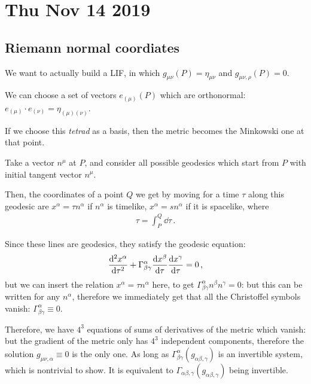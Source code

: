\documentclass[main.tex]{subfiles}
\begin{document}
\section*{Thu Nov 14 2019}

\subsection{Riemann normal coordiates}

We want to actually build a LIF, in which \(g_{\mu \nu } (P ) = \eta_{\mu \nu }\) and \(g_{\mu \nu , \rho } (P)= 0\).

We can choose a set of vectors \(e_{(\mu )} (P)\) which are orthonormal: \(e_{(\mu )} \cdot e_{(\nu )} = \eta_{(\mu )(\nu )}\). 

If we choose this \emph{tetrad} as a basis, then the metric becomes the Minkowski one at that point.

Take a vector \(n^{\mu }\) at \(P\), and consider all possible geodesics which start from \(P\) with initial tangent vector \(n^{\mu }\).

Then, the coordinates of a point \(Q\) we get by moving for a time \(\tau \) along this geodesic are \(x^{\alpha } = \tau n^{\alpha }\) if \(n^{\alpha }\) is timelike, \(x^{\alpha } = s n^{\alpha }\) if it is spacelike, where 
%
\begin{align}
  \tau = \int _{P}^{Q} \dd{\tau } 
\,.
\end{align}

Since these lines are geodesics, they satisfy the geodesic equation: 
%
\begin{align}
  \dv[2]{x^{\alpha }}{\tau } + \Gamma^{\alpha }_{\beta \gamma } \dv{x^{\beta }}{\tau } \dv{x^{\gamma }}{\tau } = 0
\,,
\end{align}
%
but we can insert the relation \(x^{\alpha } = \tau n^{\alpha }\) here, to get \(\Gamma^{\alpha }_{\beta \gamma } n^{\beta } n^{\gamma }=0\): but this can be written for any \(n^{\alpha }\), therefore we immediately get that all the Christoffel symbols vanish: \(\Gamma^{ \alpha }_{\beta \gamma } \equiv 0\). 

Therefore, we have \(4^{3}\) equations of sums of derivatives of the metric which vanish: but the gradient of the metric only has \(4^{3}\) independent components, therefore the solution \(g_{\mu \nu , \alpha } \equiv 0\) is the only one.
As long as \(\Gamma^{\alpha }_{\beta \gamma } (g_{\alpha \beta , \gamma })\) is an invertible system, which is nontrivial to show.
It is equivalent to \(\Gamma_{\alpha \beta , \gamma } (g_{\alpha \beta , \gamma })\) being invertible.
\end{document}
